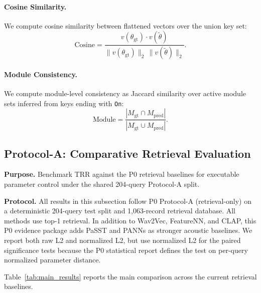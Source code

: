 \paragraph{Cosine Similarity.}
We compute cosine similarity between flattened vectors over the union key set:
\begin{equation}
		\text{Cosine} = \frac{v(\theta_{\text{gt}})\cdot v(\tilde{\theta})}{\|v(\theta_{\text{gt}})\|_2\,\|v(\tilde{\theta})\|_2}.
\end{equation}

\paragraph{Module Consistency.}
We compute module-level consistency as Jaccard similarity over active module sets inferred from keys ending with \texttt{On}:
\begin{equation}
	\text{Module} = \frac{|M_{\text{gt}} \cap M_{\text{pred}}|}{|M_{\text{gt}} \cup M_{\text{pred}}|}.
\end{equation}

\subsection{Protocol-A: Comparative Retrieval Evaluation}
\label{ssec:protocolA}

\textbf{Purpose.} Benchmark TRR against the P0 retrieval baselines for executable parameter control under the shared 204-query Protocol-A split.

\textbf{Protocol.} All results in this subsection follow P0 Protocol-A (retrieval-only) on a deterministic 204-query test split and 1,063-record retrieval database. All methods use top-1 retrieval. In addition to Wav2Vec, FeatureNN, and CLAP, this P0 evidence package adds PaSST and PANNs as stronger acoustic baselines. We report both raw L2 and normalized L2, but use normalized L2 for the paired significance tests because the P0 statistical report defines the test on per-query normalized parameter distance.

Table~\ref{tab:main_results} reports the main comparison across the current retrieval baselines.


